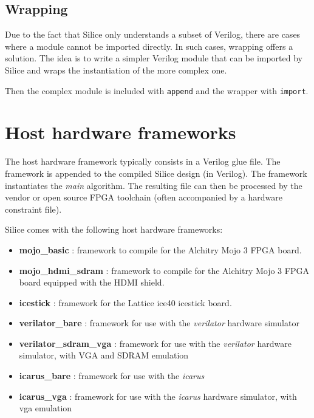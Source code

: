 \documentclass[a4]{article}
\newcommand\todo[1]{{\color{magenta}\textbf{TODO:} #1}}
\newcommand\verilog{Verilog}
\newcommand\silice{Silice}
\begin{document}
\subsection{Wrapping}

Due to the fact that \silice{} only understands a subset of \verilog{}, there
are cases where a module cannot be imported directly. In such cases, wrapping
offers a solution. The idea is to write a simpler \verilog{} module that can be imported by \silice{} and wraps the instantiation of the more complex one.

Then the complex module is included with \texttt{append} and the wrapper with \texttt{import}.


\section{Host hardware frameworks}
\label{sec:host}

The host hardware framework typically consists in a \verilog{} glue file. The framework is appended to the compiled \silice{} design (in \verilog{}). The framework instantiates the \textit{main} algorithm. The resulting file can then be processed by the vendor or open source FPGA toolchain (often accompanied by a hardware constraint file).

\silice{} comes with the following host hardware frameworks:
\begin{itemize}
	\item \textbf{mojo\_basic} : framework to compile for the Alchitry Mojo 3 FPGA board.
	\item \textbf{mojo\_hdmi\_sdram} : framework to compile for the Alchitry Mojo 3 FPGA board equipped with the HDMI shield.
	\item \textbf{icestick} : framework for the Lattice ice40 icestick board.
	\item \textbf{verilator\_bare} : framework for use with the \textit{verilator} hardware simulator
	\item \textbf{verilator\_sdram\_vga} : framework for use with the \textit{verilator} hardware simulator, with VGA and SDRAM emulation
	\item \textbf{icarus\_bare} : framework for use with the \textit{icarus}
	\item \textbf{icarus\_vga} : framework for use with the \textit{icarus} hardware simulator, with vga emulation
\end{itemize}
\end{document}
